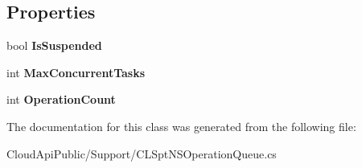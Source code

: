 \subsection*{Properties}
\begin{DoxyCompactItemize}
\item 
\hypertarget{class_cloud_api_public_1_1_support_1_1_c_l_spt_n_s_operation_queue_ab1b348f2fd9467b4dcf4a330ae796203}{bool {\bfseries Is\-Suspended}}\label{class_cloud_api_public_1_1_support_1_1_c_l_spt_n_s_operation_queue_ab1b348f2fd9467b4dcf4a330ae796203}

\item 
\hypertarget{class_cloud_api_public_1_1_support_1_1_c_l_spt_n_s_operation_queue_a5503247855bb50b3c932b34b455d037e}{int {\bfseries Max\-Concurrent\-Tasks}}\label{class_cloud_api_public_1_1_support_1_1_c_l_spt_n_s_operation_queue_a5503247855bb50b3c932b34b455d037e}

\item 
\hypertarget{class_cloud_api_public_1_1_support_1_1_c_l_spt_n_s_operation_queue_a139b57bf673cba988ca7cba8798d9736}{int {\bfseries Operation\-Count}}\label{class_cloud_api_public_1_1_support_1_1_c_l_spt_n_s_operation_queue_a139b57bf673cba988ca7cba8798d9736}

\end{DoxyCompactItemize}


The documentation for this class was generated from the following file\-:\begin{DoxyCompactItemize}
\item 
Cloud\-Api\-Public/\-Support/C\-L\-Spt\-N\-S\-Operation\-Queue.\-cs\end{DoxyCompactItemize}
